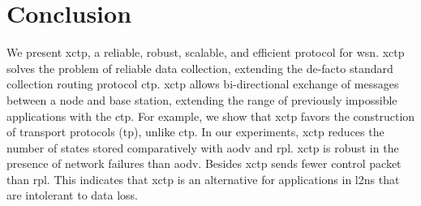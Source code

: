 \section{Conclusion}
\label{sec:conclusion}



We present \ac{xctp}, a reliable, robust, scalable, and efficient protocol for \ac{wsn}. \ac{xctp} solves the problem of reliable data collection, extending the de-facto standard collection routing protocol \ac{ctp}. \ac{xctp} allows bi-directional exchange of messages between a node and base station, extending the range of previously impossible applications with the \ac{ctp}. For example, we show that \ac{xctp} favors the construction of transport protocols (\ac{tp}), unlike \ac{ctp}. In our experiments, \ac{xctp} reduces the number of states stored comparatively with \ac{aodv} and \ac{rpl}. \ac{xctp} is robust in the presence of network failures than \ac{aodv}. Besides \ac{xctp} sends fewer control packet than \ac{rpl}. This indicates that \ac{xctp} is an alternative for applications in \ac{l2ns} that are intolerant to data loss.